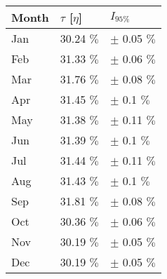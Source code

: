 \begin{tabular}{lll}
\toprule
Month & $\tau$ [$\eta$] &       $I_{95\%}$ \\
\midrule
  Jan &      30.24 $\%$ &  $\pm$ 0.05 $\%$ \\
  Feb &      31.33 $\%$ &  $\pm$ 0.06 $\%$ \\
  Mar &      31.76 $\%$ &  $\pm$ 0.08 $\%$ \\
  Apr &      31.45 $\%$ &   $\pm$ 0.1 $\%$ \\
  May &      31.38 $\%$ &  $\pm$ 0.11 $\%$ \\
  Jun &      31.39 $\%$ &   $\pm$ 0.1 $\%$ \\
  Jul &      31.44 $\%$ &  $\pm$ 0.11 $\%$ \\
  Aug &      31.43 $\%$ &   $\pm$ 0.1 $\%$ \\
  Sep &      31.81 $\%$ &  $\pm$ 0.08 $\%$ \\
  Oct &      30.36 $\%$ &  $\pm$ 0.06 $\%$ \\
  Nov &      30.19 $\%$ &  $\pm$ 0.05 $\%$ \\
  Dec &      30.19 $\%$ &  $\pm$ 0.05 $\%$ \\
\bottomrule
\end{tabular}
